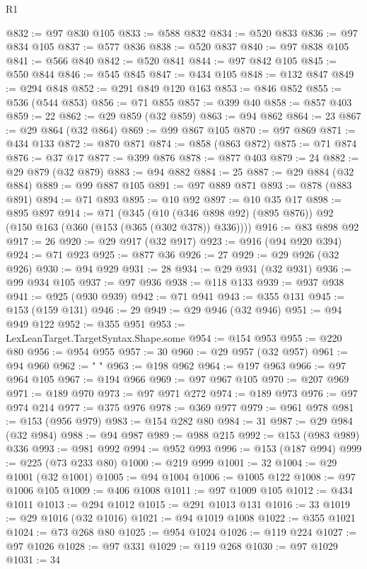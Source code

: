 \begin{lexlean}{R1}
\begin{coremodule}
{{{{{{{{{{{{{{{{{{{{{{{{{{{{{{{{{{{{{{{{{{{{{{{{{{{{{{{{{{{{{{{{{{{{{{{{{{{{{{{{{{{{{{{{{{{{{{{{{{{{{{{{{{{{{{{{{{{{{{{{{{{{{{{{{{{{{{{{{{{{{{{{{{{{{{{{{{{{{{{{{{{{{{{{{{{{{{{{{{{{{{{{{{@832 := @97 @830 @105
@833 := @588 @832
@834 := @520 @833
@836 := @97 @834 @105
@837 := @577 @836
@838 := @520 @837
@840 := @97 @838 @105
@841 := @566 @840
@842 := @520 @841
@844 := @97 @842 @105
@845 := @550 @844
@846 := @545 @845
@847 := @434 @105
@848 := @132 @847
@849 := @294 @848
@852 := @291 @849 @120 @163
@853 := @846 @852
@855 := @536 (@544 @853)
@856 := @71 @855
@857 := @399 @40
@858 := @857 @403
@859 := 22
@862 := @29 @859 (@32 @859)
@863 := @94 @862
@864 := 23
@867 := @29 @864 (@32 @864)
@869 := @99 @867 @105
@870 := @97 @869
@871 := @434 @133
@872 := @870 @871
@874 := @858 (@863 @872)
@875 := @71 @874
@876 := @37 @17
@877 := @399 @876
@878 := @877 @403
@879 := 24
@882 := @29 @879 (@32 @879)
@883 := @94 @882
@884 := 25
@887 := @29 @884 (@32 @884)
@889 := @99 @887 @105
@891 := @97 @889 @871
@893 := @878 (@883 @891)
@894 := @71 @893
@895 := @10 @92
@897 := @10 @35 @17
@898 := @895 @897
@914 := @71
    (@345 (@10 (@346 @898 @92) (@895 @876)) @92 (@150 @163 (@360 (@153 (@365 (@302 @378)) @336))))
@916 := @83 @898 @92
@917 := 26
@920 := @29 @917 (@32 @917)
@923 := @916 (@94 @920 @394)
@924 := @71 @923
@925 := @877 @36
@926 := 27
@929 := @29 @926 (@32 @926)
@930 := @94 @929
@931 := 28
@934 := @29 @931 (@32 @931)
@936 := @99 @934 @105
@937 := @97 @936
@938 := @118 @133
@939 := @937 @938
@941 := @925 (@930 @939)
@942 := @71 @941
@943 := @355 @131
@945 := @153 (@159 @131)
@946 := 29
@949 := @29 @946 (@32 @946)
@951 := @94 @949 @122
@952 := @355 @951
@953 := LexLeanTarget.TargetSyntax.Shape.some
@954 := @154 @953
@955 := @220 @80
@956 := @954 @955
@957 := 30
@960 := @29 @957 (@32 @957)
@961 := @94 @960
@962 := " "
@963 := @198 @962
@964 := @197 @963
@966 := @97 @964 @105
@967 := @194 @966
@969 := @97 @967 @105
@970 := @207 @969
@971 := @189 @970
@973 := @97 @971 @272
@974 := @189 @973
@976 := @97 @974 @214
@977 := @375 @976
@978 := @369 @977
@979 := @961 @978
@981 := @153 (@956 @979)
@983 := @154 @282 @80
@984 := 31
@987 := @29 @984 (@32 @984)
@988 := @94 @987
@989 := @988 @215
@992 := @153 (@983 @989) @336
@993 := @981 @992
@994 := @952 @993
@996 := @153 (@187 @994)
@999 := @225 (@73 @233 @80)
@1000 := @219 @999
@1001 := 32
@1004 := @29 @1001 (@32 @1001)
@1005 := @94 @1004
@1006 := @1005 @122
@1008 := @97 @1006 @105
@1009 := @406 @1008
@1011 := @97 @1009 @105
@1012 := @434 @1011
@1013 := @294 @1012
@1015 := @291 @1013 @131
@1016 := 33
@1019 := @29 @1016 (@32 @1016)
@1021 := @94 @1019 @1008
@1022 := @355 @1021
@1024 := @73 @268 @80
@1025 := @954 @1024
@1026 := @119 @224
@1027 := @97 @1026
@1028 := @97 @331
@1029 := @119 @268
@1030 := @97 @1029
@1031 := 34
}}}}}}}}}}}}}}}}}}}}}}}}}}}}}}}}}}}}}}}}}}}}}}}}}}}}}}}}}}}}}}}}}}}}}}}}}}}}}}}}}}}}}}}}}}}}}}}}}}}}}}}}}}}}}}}}}}}}}}}}}}}}}}}}}}}}}}}}}}}}}}}}}}}}}}}}}}}}}}}}}}}}}}}}}}}}}}}}}}}}}}}}}}
\end{coremodule}
\end{lexlean}
